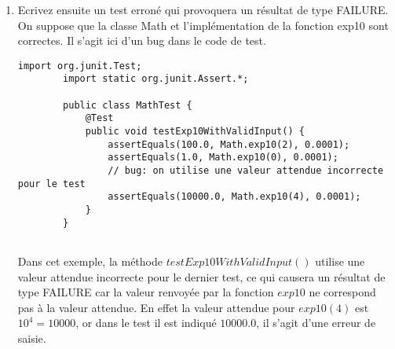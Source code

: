 \begin{enumerate}
\begin{lstlisting}[style=monstyle]
		public class MathTest {
			@Test
			public void testExp10WithValidInput() {
				// bug: on utilise la m\'ethode assertEquals() qui teste si les valeurs sont \'egales,
				// alors qu'on devrait utiliser la m\'ethode assertEquals() qui teste si les deux valeurs sont \'egales avec un certain delta.
				assertEquals(100.0, Math.exp10(2));
				assertEquals(1.0, Math.exp10(0));
				assertEquals(1000.0, Math.exp10(3));
			}
		}
		
	\end{lstlisting}
Dans cet exemple, la méthode testExp10WithValidInput() utilise la méthode assertEquals() qui teste si les deux valeurs sont égales. Cependant, la fonction exp10 peut renvoyer un résultat avec une certaine précision, il est donc nécessaire de vérifier si les deux valeurs sont égales avec un certain delta.
Ainsi, le test échouera car il n'y a pas de tolérance pour l'erreur de calcul. Ce qui causera un résultat de type ERROR.
	\item Ecrivez ensuite un test erroné qui provoquera un résultat de type FAILURE. On suppose que la classe Math et l'implémentation de la fonction exp10 sont correctes. Il s'agit ici d'un bug dans le code de test.
	\begin{lstlisting}[style=monstyle]
		import org.junit.Test;
		import static org.junit.Assert.*;
		
		public class MathTest {
			@Test
			public void testExp10WithValidInput() {
				assertEquals(100.0, Math.exp10(2), 0.0001);
				assertEquals(1.0, Math.exp10(0), 0.0001);
				// bug: on utilise une valeur attendue incorrecte pour le test
				assertEquals(10000.0, Math.exp10(4), 0.0001);
			}
		}
		
	\end{lstlisting}
Dans cet exemple, la méthode $testExp10WithValidInput()$ utilise une valeur attendue incorrecte pour le dernier test, ce qui causera un résultat de type FAILURE car la valeur renvoyée par la fonction $exp10$ ne correspond pas à la valeur attendue.
En effet la valeur attendue pour $exp10(4)$ est $10^4 = 10 000$, or dans le test il est indiqué $10000.0$, il s'agit d'une erreur de saisie.
\end{enumerate}
